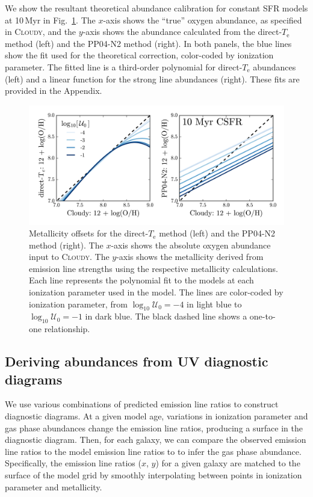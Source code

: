 \documentclass[preprint2]{aastex62}
\newcommand{\Cloudy}{\textsc{Cloudy}\xspace}
\newcommand{\Myr}{$\,$Myr\xspace}
\newcommand{\logten}{\ensuremath{\log_{10}}}
\newcommand{\logUeq}[1]{\ensuremath{\logten \mathcal{U}_0 = #1}}
\newcommand{\Te}{\ensuremath{T_{\mathrm{e}}}\xspace}
\begin{document}
We show the resultant theoretical abundance calibration for constant SFR models at 10\Myr in Fig.~\ref{fig:offset}. The $x$-axis shows the ``true'' oxygen abundance, as specified in \Cloudy, and the $y$-axis shows the abundance calculated from the direct-\Te method (left) and the PP04-N2 method (right). In both panels, the blue lines show the fit used for the theoretical correction, color-coded by ionization parameter. The fitted line is a third-order polynomial for direct-\Te abundances (left) and a linear function for the strong line abundances (right). These fits are provided in the Appendix.

\begin{figure}
  \begin{center}
    \includegraphics[width=\linewidth]{figs/f2.png}
    \caption{Metallicity offsets for the direct-\Te method (left) and the PP04-N2 method (right). The $x$-axis shows the absolute oxygen abundance input to \Cloudy. The $y$-axis shows the metallicity derived from emission line strengths using the respective metallicity calculations. Each line represents the polynomial fit to the models at each ionization parameter used in the model. The lines are color-coded by ionization parameter, from \logUeq{-4} in light blue to \logUeq{-1} in dark blue. The black dashed line shows a one-to-one relationship.}
    \label{fig:offset}
  \end{center}
\end{figure}

\subsection{Deriving abundances from UV diagnostic diagrams}\label{sec:Z:UV}
We use various combinations of predicted emission line ratios to construct diagnostic diagrams. At a given model age, variations in ionization parameter and gas phase abundances change the emission line ratios, producing a surface in the diagnostic diagram. Then, for each galaxy, we can compare the observed emission line ratios to the model emission line ratios to to infer the gas phase abundance. Specifically, the emission line ratios ($x$, $y$) for a given galaxy are matched to the surface of the model grid by smoothly interpolating between points in ionization parameter and metallicity.
\end{document}
